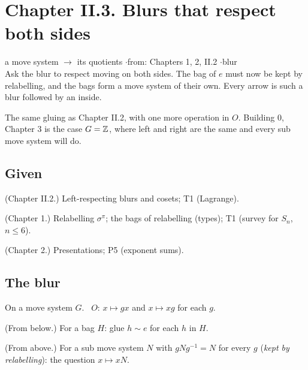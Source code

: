 \section*{Chapter II.3. Blurs that respect both sides}
\begin{center}
{\normalsize a move system $\to$ its quotients \quad$\cdot$\quad from: Chapters 1, 2, II.2 \quad$\cdot$\quad blur}\\[4pt]
{\small Ask the blur to respect moving on both sides. The bag of $e$ must now be kept by relabelling, and the bags form a move system of their own. Every arrow is such a blur followed by an inside.}
\end{center}

The same gluing as Chapter II.2, with one more operation in $O$. Building 0, Chapter 3 is the case $G = \mathbb{Z}$, where left and right are the same and every sub move system will do.

\subsection*{Given}

\begin{lines}
\item[\lab{G1}] (Chapter II.2.) Left-respecting blurs and cosets; T1 (Lagrange).
\item[\lab{G2}] (Chapter 1.) Relabelling $\sigma^\pi$; the bags of relabelling (types); T1 (survey for $S_n$, $n \le 6$).
\item[\lab{G3}] (Chapter 2.) Presentations; P5 (exponent sums).
\end{lines}

\subsection*{The blur}

On a move system $G$. \ $O$: $x \mapsto gx$ and $x \mapsto xg$ for each $g$.

\begin{lines}
\item[\lab{B1}] (From below.) For a bag $H$: glue $h \sim e$ for each $h$ in $H$.
\item[\lab{B2}] (From above.) For a sub move system $N$ with $gNg^{-1} = N$ for every $g$ (\emph{kept by relabelling}): the question $x \mapsto xN$.
\end{lines}

